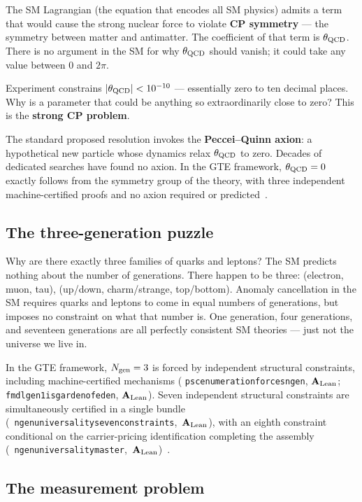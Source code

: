 \documentclass[11pt,a4paper]{article}
\newcommand{\term}[1]{\textbf{#1}}
\newcommand{\lean}[1]{%
  \penalty-100
  \begingroup\def\_{\textunderscore\allowbreak}\texttt{#1}\endgroup}
\newcommand{\CatAL}{\ensuremath{\mathbf{A}_{\rm Lean}}}
\begin{document}
The SM Lagrangian (the equation that encodes all SM physics) admits a term
that would cause the strong nuclear force to violate \term{CP symmetry}
--- the symmetry between matter and antimatter.
The coefficient of that term is $\theta_{\rm QCD}$.
There is no argument in the SM for why $\theta_{\rm QCD}$ should vanish;
it could take any value between 0 and $2\pi$.

Experiment constrains $|\theta_{\rm QCD}| < 10^{-10}$ --- essentially zero
to ten decimal places.
Why is a parameter that could be anything so extraordinarily close to zero?
This is the \term{strong CP problem}.

The standard proposed resolution invokes the \term{Peccei--Quinn axion}:
a hypothetical new particle whose dynamics relax $\theta_{\rm QCD}$ to zero.
Decades of dedicated searches have found no axion.
In the GTE framework, $\theta_{\rm QCD} = 0$ exactly follows from the symmetry
group of the theory, with three independent machine-certified proofs
and no axion required or predicted~\cite{SpivackGTECompleteFramework}.

\subsection{The three-generation puzzle}

Why are there exactly three families of quarks and leptons?
The SM predicts nothing about the number of generations.
There happen to be three: (electron, muon, tau), (up/down, charm/strange, top/bottom).
Anomaly cancellation in the SM requires quarks and leptons to come in equal
numbers of generations, but imposes no constraint on what that number is.
One generation, four generations, and seventeen generations are all perfectly
consistent SM theories --- just not the universe we live in.

In the GTE framework, $N_{\rm gen} = 3$ is forced by independent structural constraints,
including machine-certified mechanisms
(\lean{psc\_enumeration\_forces\_ngen\_3}, \CatAL;
\lean{fmdl\_gen1\_is\_garden\_of\_eden}, \CatAL).
Seven independent structural constraints are simultaneously certified in a single bundle
\mbox{(\lean{ngen\_universality\_seven\_constraints}, \CatAL)}, with an eighth
constraint conditional on the carrier-pricing identification completing the assembly
\mbox{(\lean{ngen\_universality\_master}, \CatAL)}~\cite{SpivackGTECompleteFramework}.

\subsection{The measurement problem}
\end{document}
